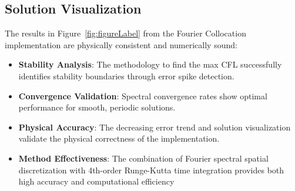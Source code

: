 \subsection{Solution Visualization}
The results in Figure~\ref{fig:figureLabel} from the Fourier Collocation  implementation are physically consistent and numerically sound:
%
\begin{itemize}
	\item \textbf{Stability Analysis}: The methodology to find the max CFL successfully identifies stability boundaries through error spike detection.
	\item \textbf{Convergence Validation}: Spectral convergence rates show optimal performance for smooth, periodic solutions.
	\item \textbf{Physical Accuracy}: The decreasing error trend and solution visualization validate the physical correctness of the implementation.
	\item \textbf{Method Effectiveness}: The combination of Fourier spectral spatial discretization with 4th-order Runge-Kutta time integration provides both high accuracy and computational efficiency
\end{itemize}
